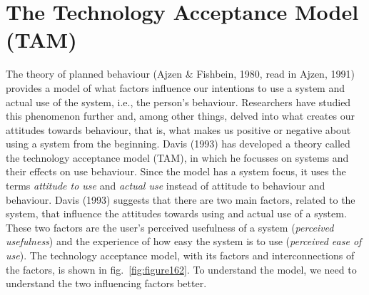 \documentclass[
  12pt,
]{scrbook}
\begin{document}
\hypertarget{the-technology-acceptance-model-tam}{%
\section*{The Technology Acceptance Model (TAM)}\label{the-technology-acceptance-model-tam}}

The theory of planned behaviour (Ajzen \& Fishbein, 1980, read in Ajzen, 1991) provides a model of what factors influence our intentions to use a system and actual use of the system, i.e., the person's behaviour. Researchers have studied this phenomenon further and, among other things, delved into what creates our attitudes towards behaviour, that is, what makes us positive or negative about using a system from the beginning. Davis (1993) has developed a theory called the technology acceptance model (TAM), in which he focusses on systems and their effects on use behaviour. Since the model has a system focus, it uses the terms \emph{attitude to use} and \emph{actual use} instead of attitude to behaviour and behaviour. Davis (1993) suggests that there are two main factors, related to the system, that influence the attitudes towards using and actual use of a system. These two factors are the user's perceived usefulness of a system (\emph{perceived usefulness}) and the experience of how easy the system is to use (\emph{perceived ease of use}). The technology acceptance model, with its factors and interconnections of the factors, is shown in fig.~\ref{fig:figure162}. To understand the model, we need to understand the two influencing factors better.~
\end{document}
